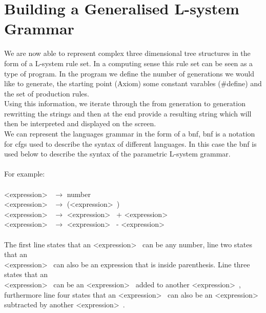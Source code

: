\section{Building a Generalised L-system Grammar}

We are now able to represent complex three dimensional tree structures in the form of a L-system rule set. In a computing sense this rule set can be seen as a type of program. In the program we define the number of generations we would like to generate, the starting point (Axiom) some constant varables (\#define) and the set of production rules. \\
Using this information, we iterate through the from generation to generation rewritting the strings and then at the end provide a resulting string which will then be interpreted and displayed on the screen.
\\
We can represent the languages grammar in the form of a \acrlong{bnf}, \acrshort{bnf} is a notation for \acrlong{cfg}s used to describe the syntax of different languages. In this case the \acrshort{bnf} is used below to describe the syntax of the parametric L-system grammar. \\
\\
For example: \\ 
\\
\textless expression\textgreater~ $\rightarrow$ number \\ 
\textless expression\textgreater~ $\rightarrow$ (\textless expression\textgreater~) \\
\textless expression\textgreater~ $\rightarrow$ \textless expression\textgreater~ + \textless expression\textgreater~ \\
\textless expression\textgreater~ $\rightarrow$ \textless expression\textgreater~ - \textless expression\textgreater~ \\
\\
The first line states that an \textless expression\textgreater~ can be any number, line two states that an \\ \textless expression\textgreater~ can also be an expression that is inside parenthesis. Line three states that an \\ \textless expression\textgreater~ can be an \textless expression\textgreater~ added to another \textless expression\textgreater~, furthermore line four states that an \textless expression\textgreater~ can also be an \textless expression\textgreater~ subtracted by another \textless expression\textgreater~. \\

